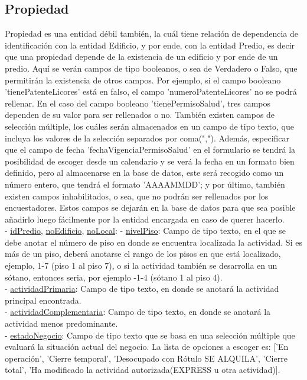 \subsection{Propiedad}
Propiedad es una entidad débil también, la cuál tiene relación de dependencia de identificación con la entidad Edificio, y por ende, con la entidad Predio, es decir que una propiedad depende de la existencia de un edificio y por ende de un predio.
Aquí se verán campos de tipo booleanos, o sea de Verdadero o Falso, que permitirán la existencia de otros campos. Por ejemplo, si el campo booleano 'tienePatenteLicores' está en falso, el campo 'numeroPatenteLicores' no se podrá rellenar. En el
caso del campo booleano 'tienePermisoSalud', tres campos dependen de su valor para ser rellenados o no. También existen campos de selección múltiple, los cuáles serán almacenados en un campo de tipo texto, que incluya los valores de la selección
separados por coma(","). Además, especificar que el campo de fecha 'fechaVigenciaPermisoSalud' en el formulario se tendrá la posibilidad de escoger desde un calendario y se verá la fecha en un formato bien definido, pero al almacenarse en la
base de datos, este será recogido como un número entero, que tendrá el formato 'AAAAMMDD'; y por último, también existen campos inhabilitados, o sea, que no podrán ser rellenados por los encuestadores. Estos campos se dejarán en la base de datos
para que sea posible añadirlo luego fácilmente por la entidad encargada en caso de querer hacerlo. \\
- \underline{idPredio}, \underline{noEdificio}, \underline{noLocal}:
- \underline{nivelPiso}:  Campo de tipo texto, en el que se debe anotar el número de piso en donde se encuentra localizada la actividad. Si es más de un piso, deberá anotarse el
rango de los pisos en que está localizado, ejemplo, 1-7 (piso 1 al piso 7), o si la actividad también se desarrolla en un sótano, entonces seria, por ejemplo -1-4 (sótano 1 al piso 4). \\
- \underline{actividadPrimaria}: Campo de tipo texto, en donde se anotará la actividad principal encontrada. \\
- \underline{actividadComplementaria}:  Campo de tipo texto, en donde se anotará la actividad menos predominante.\\
- \underline{estadoNegocio}: Campo de tipo texto que se basa en una selección múltiple que evaluará la situación actual del negocio. La lista de opciones a escoger es: ['En operación', 'Cierre temporal', 'Desocupado con Rótulo SE ALQUILA', 'Cierre total', 'Ha modificado la actividad autorizada(EXPRESS u otra actividad)].\\
